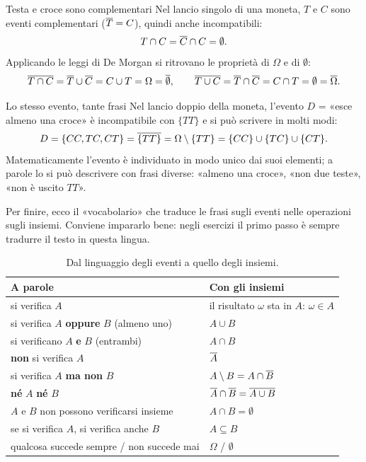 \begin{esempio}{Testa e croce sono complementari}
Nel lancio singolo di una moneta, $T$ e $C$ sono eventi complementari ($\overline{T} = C$), quindi anche incompatibili:
\[ T \cap C = \overline{C} \cap C = \emptyset . \]
Applicando le leggi di De Morgan si ritrovano le proprietà di $\Omega$ e di $\emptyset$:
\[
  \overline{T \cap C} = \overline{T} \cup \overline{C} = C \cup T = \Omega = \overline{\emptyset},
  \qquad
  \overline{T \cup C} = \overline{T} \cap \overline{C} = C \cap T = \emptyset = \overline{\Omega} .
\]
\end{esempio}

\begin{esempio}{Lo stesso evento, tante frasi}
Nel lancio doppio della moneta, l'evento $D$ = «esce almeno una croce» è incompatibile con $\{TT\}$ e si può scrivere
in molti modi:
\[
  D = \{CC, TC, CT\} = \overline{\{TT\}} = \Omega \setminus \{TT\} = \{CC\} \cup \{TC\} \cup \{CT\} .
\]
Matematicamente l'evento è individuato in modo unico dai suoi elementi; a parole lo si può descrivere con frasi
diverse: «almeno una croce», «non due teste», «non è uscito $TT$».
\end{esempio}

Per finire, ecco il «vocabolario» che traduce le frasi sugli eventi nelle operazioni sugli insiemi. Conviene impararlo
bene: negli esercizi il primo passo è sempre tradurre il testo in questa lingua.

\begin{table}[H]
\centering
\renewcommand{\arraystretch}{1.3}
\begin{tabular}{@{}ll@{}}
  \toprule
  \textbf{A parole} & \textbf{Con gli insiemi} \\
  \midrule
  si verifica $A$ & il risultato $\omega$ sta in $A$: $\omega \in A$ \\
  si verifica $A$ \textbf{oppure} $B$ (almeno uno) & $A \cup B$ \\
  si verificano $A$ \textbf{e} $B$ (entrambi) & $A \cap B$ \\
  \textbf{non} si verifica $A$ & $\overline{A}$ \\
  si verifica $A$ \textbf{ma non} $B$ & $A \setminus B = A \cap \overline{B}$ \\
  \textbf{né} $A$ \textbf{né} $B$ & $\overline{A} \cap \overline{B} = \overline{A \cup B}$ \\
  $A$ e $B$ non possono verificarsi insieme & $A \cap B = \emptyset$ \\
  se si verifica $A$, si verifica anche $B$ & $A \subseteq B$ \\
  qualcosa succede sempre / non succede mai & $\Omega$ / $\emptyset$ \\
  \bottomrule
\end{tabular}
\caption{Dal linguaggio degli eventi a quello degli insiemi.}
\end{table}

